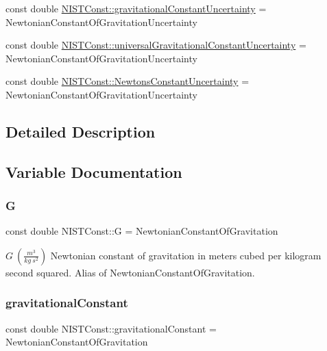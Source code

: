 \begin{DoxyCompactItemize}
\item 
const double \hyperlink{group___n_i_s_t_const-_gravitational_constant_gae0af1dfa30856852c6c5a6936eb2354f}{N\+I\+S\+T\+Const\+::gravitational\+Constant\+Uncertainty} = Newtonian\+Constant\+Of\+Gravitation\+Uncertainty
\item 
const double \hyperlink{group___n_i_s_t_const-_gravitational_constant_gaa748102f8262fa5e50c1d0090585593e}{N\+I\+S\+T\+Const\+::universal\+Gravitational\+Constant\+Uncertainty} = Newtonian\+Constant\+Of\+Gravitation\+Uncertainty
\item 
const double \hyperlink{group___n_i_s_t_const-_gravitational_constant_ga53c7e14bc44763cb827de59cd3bcff2b}{N\+I\+S\+T\+Const\+::\+Newtons\+Constant\+Uncertainty} = Newtonian\+Constant\+Of\+Gravitation\+Uncertainty
\end{DoxyCompactItemize}


\subsection{Detailed Description}


\subsection{Variable Documentation}
\mbox{\label{group___n_i_s_t_const-_gravitational_constant_gad3f54a7cdc3ea6fd2fbc4a30ce7df201}} 
\subsubsection{\texorpdfstring{G}{G}}
{\footnotesize\ttfamily const double N\+I\+S\+T\+Const\+::G = Newtonian\+Constant\+Of\+Gravitation}

$G \ (\frac{m^3}{kg\ s^2})$ Newtonian constant of gravitation in meters cubed per kilogram second squared. Alias of Newtonian\+Constant\+Of\+Gravitation. \mbox{\label{group___n_i_s_t_const-_gravitational_constant_ga5a77947aedbfa6b29249f5b25f22137b}} 
\subsubsection{\texorpdfstring{gravitational\+Constant}{gravitationalConstant}}
{\footnotesize\ttfamily const double N\+I\+S\+T\+Const\+::gravitational\+Constant = Newtonian\+Constant\+Of\+Gravitation}

